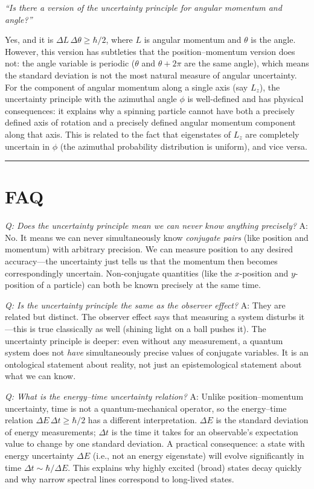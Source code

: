 \documentclass[11pt,openright]{book}
\begin{document}
\textit{``Is there a version of the uncertainty principle for angular momentum and angle?''}

Yes, and it is $\Delta L\,\Delta\theta \geq \hbar/2$, where $L$ is angular momentum and $\theta$ is the angle. However, this version has subtleties that the position--momentum version does not: the angle variable is periodic ($\theta$ and $\theta + 2\pi$ are the same angle), which means the standard deviation is not the most natural measure of angular uncertainty. For the component of angular momentum along a single axis (say $L_z$), the uncertainty principle with the azimuthal angle $\phi$ is well-defined and has physical consequences: it explains why a spinning particle cannot have both a precisely defined axis of rotation and a precisely defined angular momentum component along that axis. This is related to the fact that eigenstates of $L_z$ are completely uncertain in $\phi$ (the azimuthal probability distribution is uniform), and vice versa.

\bigskip
\hrule
\bigskip
\section*{FAQ}

\textit{Q: Does the uncertainty principle mean we can never know anything precisely?}
A: No. It means we can never simultaneously know \emph{conjugate pairs} (like position and momentum) with arbitrary precision. We can measure position to any desired accuracy---the uncertainty just tells us that the momentum then becomes correspondingly uncertain. Non-conjugate quantities (like the $x$-position and $y$-position of a particle) can both be known precisely at the same time.

\textit{Q: Is the uncertainty principle the same as the observer effect?}
A: They are related but distinct. The observer effect says that measuring a system disturbs it---this is true classically as well (shining light on a ball pushes it). The uncertainty principle is deeper: even without any measurement, a quantum system does not \emph{have} simultaneously precise values of conjugate variables. It is an ontological statement about reality, not just an epistemological statement about what we can know.

\textit{Q: What is the energy--time uncertainty relation?}
A: Unlike position--momentum uncertainty, time is not a quantum-mechanical operator, so the energy--time relation $\Delta E\,\Delta t \geq \hbar/2$ has a different interpretation. $\Delta E$ is the standard deviation of energy measurements; $\Delta t$ is the time it takes for an observable's expectation value to change by one standard deviation. A practical consequence: a state with energy uncertainty $\Delta E$ (i.e., not an energy eigenstate) will evolve significantly in time $\Delta t \sim \hbar/\Delta E$. This explains why highly excited (broad) states decay quickly and why narrow spectral lines correspond to long-lived states.
\end{document}
